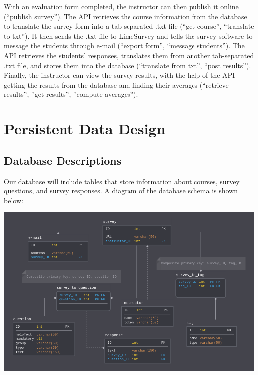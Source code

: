 \documentclass{article}
\begin{document}
With an evaluation form completed, the instructor can then publish it online (``publish survey''). The API retrieves the course information from the database to translate the survey form into a tab-separated .txt file (``get course'', ``translate to txt''). It then sends the .txt file to LimeSurvey and tells the survey software to message the students through e-mail (``export form'', ``message students''). The API retrieves the students' responses, translates them from another tab-separated .txt file, and stores them into the database (``translate from txt'', ``post results''). Finally, the instructor can view the survey results, with the help of the API getting the results from the database and finding their averages (``retrieve results'', ``get results'', ``compute averages'').

\section{Persistent Data Design}
\subsection{Database Descriptions}

Our database will include tables that store information about courses, survey questions, and survey responses. A diagram of the database schema is shown below:

\begin{center}
\label{fig:schemadiagram}
{\includegraphics[scale=.6]{images/schema_diagram.png}} 
\end{center}

\vspace{5mm}
\end{document}
